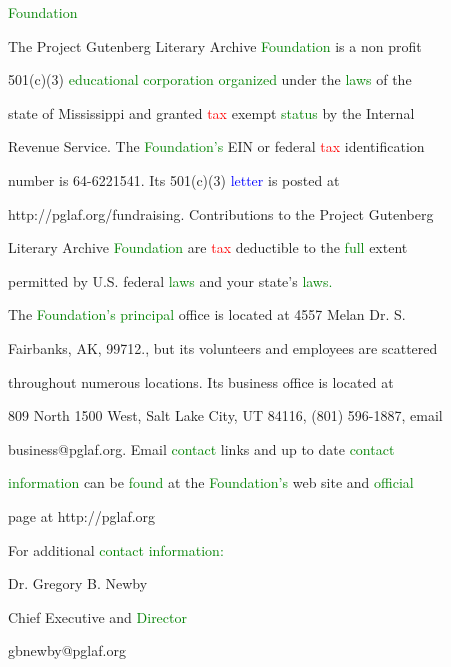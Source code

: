  \textcolor{green}{Foundation}



 The Project Gutenberg Literary Archive \textcolor{green}{Foundation} is a non profit

 501(c)(3) \textcolor{green}{educational} \textcolor{green}{corporation} \textcolor{green}{organized} under the \textcolor{green}{laws} of the

 state of Mississippi and \textcolor{BurntOrange}{granted} \textcolor{red}{tax} exempt \textcolor{green}{status} by the Internal

 Revenue Service. The \textcolor{green}{Foundation’s} EIN or federal \textcolor{red}{tax} identification

 number is 64-6221541. Its 501(c)(3) \textcolor{blue}{letter} is posted at

 http://pglaf.org/fundraising. Contributions to the Project Gutenberg

 Literary Archive \textcolor{green}{Foundation} are \textcolor{red}{tax} deductible to the \textcolor{green}{full} extent

 permitted by U.S. federal \textcolor{green}{laws} and your state’s \textcolor{green}{laws.}



 The \textcolor{green}{Foundation’s} \textcolor{green}{principal} office is located at 4557 Melan Dr. S.

 Fairbanks, AK, 99712., but its \textcolor{BurntOrange}{volunteers} and employees are scattered

 throughout numerous locations. Its business office is located at

 809 North 1500 West, Salt Lake City, UT 84116, (801) 596-1887, email

 business@pglaf.org. Email \textcolor{green}{contact} links and up to date \textcolor{green}{contact}

 \textcolor{green}{information} can be \textcolor{green}{found} at the \textcolor{green}{Foundation’s} web site and \textcolor{green}{official}

 page at http://pglaf.org



 For additional \textcolor{green}{contact} \textcolor{green}{information:}

 Dr. Gregory B. Newby

 Chief Executive and \textcolor{green}{Director}

 gbnewby@pglaf.org






